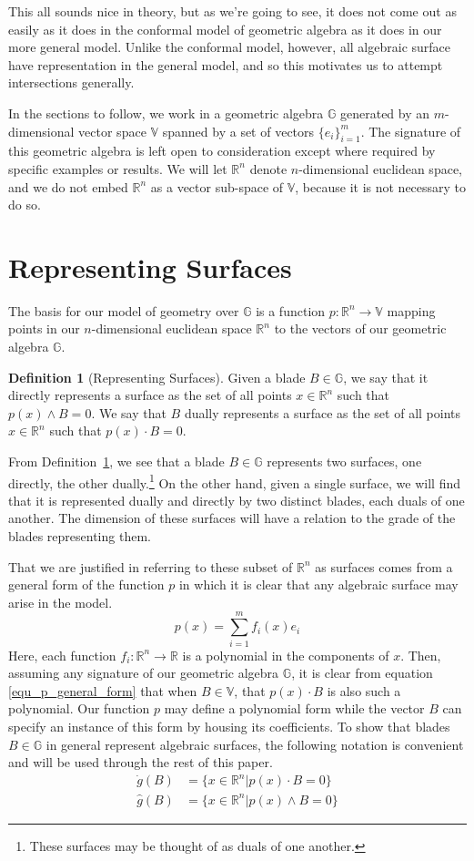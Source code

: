 \documentclass{birkjour}
\theoremstyle{definition}
\newtheorem{defn}[thm]{Definition}
\theoremstyle{remark}
\numberwithin{equation}{section}
\newcommand{\R}{\mathbb{R}}
\newcommand{\G}{\mathbb{G}}
\newcommand{\V}{\mathbb{V}}
\newcommand{\gd}{\dot{g}}
\newcommand{\gh}{\hat{g}}
\begin{document}
This all sounds nice in theory, but as we're going to see, it does not come out as easily as it does in the conformal
model of geometric algebra as it does in our more general model.  Unlike the conformal model, however, all algebraic
surface have representation in the general model, and so this motivates us to attempt intersections generally.

In the sections to follow, we work in a geometric algebra $\G$ generated by an $m$-dimensional vector space $\V$
spanned by a set of vectors $\{e_i\}_{i=1}^m$.  The signature of this geometric algebra is left open to
consideration except where required by specific examples or results.  We will let $\R^n$ denote
$n$-dimensional euclidean space, and we do not embed $\R^n$ as a vector sub-space of $\V$, because
it is not necessary to do so.

\section{Representing Surfaces}

The basis for our model of geometry over $\G$ is a function $p:\R^n\to\V$ mapping points
in our $n$-dimensional euclidean space $\R^n$ to the vectors of our geometric algebra $\G$.

\begin{defn}[Representing Surfaces]\label{def_surface_representation}
Given a blade $B\in\G$, we say that it directly represents a surface as the set of
all points $x\in\R^n$ such that $p(x)\wedge B=0$.  We say that $B$ dually represents
a surface as the set of all points $x\in\R^n$ such that $p(x)\cdot B=0$.
\end{defn}
From Definition~\ref{def_surface_representation}, we see that a blade $B\in\G$ represents two surfaces, one
directly, the other dually.\footnote{These surfaces may be thought of as duals of one another.}
On the other hand, given a single surface, we will find that it is represented dually and directly
by two distinct blades, each duals of one another.
The dimension of these surfaces will have a relation to the grade of the blades representing them.

That we are justified in referring to these subset of $\R^n$ as surfaces comes from a
general form of the function $p$ in which it is clear that any algebraic surface may arise in the model.
\begin{equation}\label{equ_p_general_form}
p(x) = \sum_{i=1}^m f_i(x)e_i
\end{equation}
Here, each function $f_i:\R^n\to\R$ is a polynomial in the components of $x$.  Then, assuming
any signature of our geometric algebra $\G$, it is clear from equation \eqref{equ_p_general_form}
that when $B\in\V$, that $p(x)\cdot B$ is also such a polynomial.  Our function $p$ may define
a polynomial form while the vector $B$ can specify an instance of this form by housing its coefficients.
To show that blades $B\in\G$ in general represent algebraic surfaces, the following notation is convenient
and will be used through the rest of this paper.
\begin{align*}
\gd(B) &= \{x\in\R^n|p(x)\cdot B=0\} \\
\gh(B) &= \{x\in\R^n|p(x)\wedge B = 0\}
\end{align*}
\end{document}
